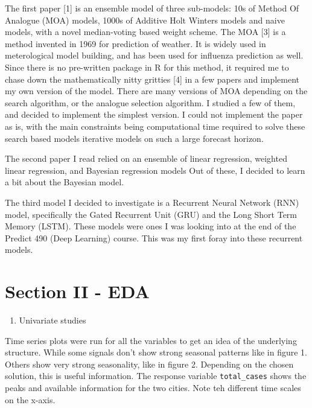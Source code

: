 \documentclass[floatsintext,man]{apa6}
\providecommand{\tightlist}{%
  \setlength{\itemsep}{0pt}\setlength{\parskip}{0pt}}
\theoremstyle{definition}
\theoremstyle{definition}
\theoremstyle{definition}
\theoremstyle{remark}
\begin{document}
The first paper {[}1{]} is an ensemble model of three sub-models: 10s of
Method Of Analogue (MOA) models, 1000s of Additive Holt Winters models
and naive models, with a novel median-voting based weight scheme. The
MOA {[}3{]} is a method invented in 1969 for prediction of weather. It
is widely used in meterological model building, and has been used for
influenza prediction as well. Since there is no pre-written package in R
for this method, it required me to chase down the mathematically nitty
gritties {[}4{]} in a few papers and implement my own version of the
model. There are many versions of MOA depending on the search algorithm,
or the analogue selection algorithm. I studied a few of them, and
decided to implement the simplest version. I could not implement the
paper as is, with the main constraints being computational time required
to solve these search based models iterative models on such a large
forecast horizon.

The second paper I read relied on an ensemble of linear regression,
weighted linear regression, and Bayesian regression models Out of these,
I decided to learn a bit about the Bayesian model.

The third model I decided to investigate is a Recurrent Neural Network
(RNN) model, specifically the Gated Recurrent Unit (GRU) and the Long
Short Term Memory (LSTM). These models were ones I was looking into at
the end of the Predict 490 (Deep Learning) course. This was my first
foray into these recurrent models.

\section{Section II - EDA}\label{section-ii---eda}

\begin{enumerate}
\def\labelenumi{\arabic{enumi}.}
\tightlist
\item
  Univariate studies
\end{enumerate}

Time series plots were run for all the variables to get an idea of the
underlying structure. While some signals don't show strong seasonal
patterns like in figure 1. Others show very strong seasonality, like in
figure 2. Depending on the chosen solution, this is useful information.
The response variable \texttt{total\_cases} shows the peaks and
available information for the two cities. Note teh different time scales
on the x-axis.
\end{document}
